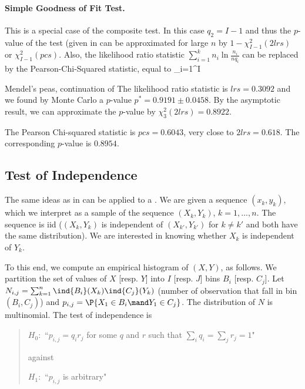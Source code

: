 \paragraph{Simple Goodness of Fit Test.} This is a special case of the composite test.
In this case $q_2=I-1$ and thus the $p$-value of the test
(given in  can be approximated for large $n$
by  $1- \chi^2_{I-1}( 2 lrs)$ or $\chi^2_{I-1}( pcs)$. Also,
the likelihood ratio statistic $\sum_{i=1}^k n_i
 \ln\frac{n_i}{n q_i}$ can be replaced by the
Pearson-Chi-Squared statistic, equal to
 \be
\sum_{i=1}^I 
 \ee
\begin{exnn}{Mendel's peas, continuation of
} The likelihood ratio statistic is
$lrs=0.3092$ and we found by Monte Carlo a $p$-value $p^* =
0.9191\pm 0.0458$. By the asymptotic result, we can approximate the
$p$-value by $\chi^2_3(2 lrs)= 0.8922$.

The Pearson Chi-squared statistic is $pcs=0.6043$, very close
to $2 lrs=0.618$. The corresponding $p$-value is $0.8954$.
\end{exnn}

\subsection{Test of Independence}
The same ideas as in  can be applied to a
. We are given a sequence $(x_k,
y_k)$, which we interpret as a sample of the sequence $(X_k,
Y_k)$, $k=1,...,n$. The sequence is iid ($(X_k, Y_k)$ is
independent of $(X_{k'}, Y_{k'})$ for $k\neq k'$ and both have the same
distribution). We are interested in knowing whether $X_k$ is
independent of $Y_k$.

To this end, we compute an empirical histogram of $(X, Y)$, as follows. We
partition the set of values
of $X$ [resp. $Y$] into $I$ [resp. $J$] bins $B_i$ [resp. $C_j$].
Let $N_{i,j}=\sum_{k=1}^n \ind{B_i}(X_k) \ind{C_j}(Y_k)$
(number of observation that fall in bin $(B_i, C_j)$) and $p_{i,j}=\P\{X_1\in
B_i \mand Y_1\in
C_j \}$. The distribution of
$N$ is multinomial. The test of independence is
\begin{quote}
 $H_0$:~``$p_{i,j}=q_i r_j$ for some $q$ and $r$ such that $\sum_i q_i = \sum_j r_j =1$"

 against

$H_1$:~``$p_{i,j}$ is arbitrary"
\end{quote}

